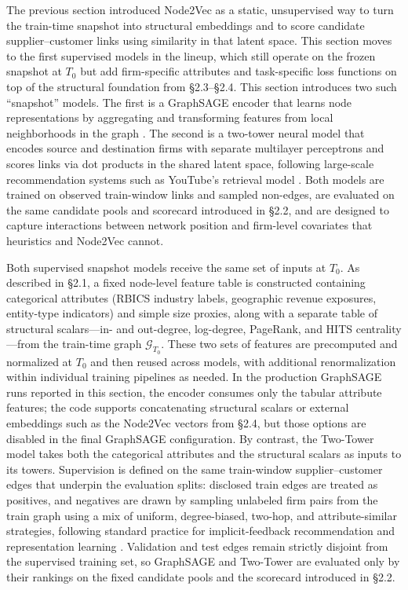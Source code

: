 The previous section introduced Node2Vec as a static, unsupervised way to turn the train-time snapshot into structural embeddings and to score candidate supplier--customer links using similarity in that latent space. This section moves to the first supervised models in the lineup, which still operate on the frozen snapshot at \(T_0\) but add firm-specific attributes and task-specific loss functions on top of the structural foundation from \S2.3--\S2.4. This section introduces two such ``snapshot'' models. The first is a GraphSAGE encoder that learns node representations by aggregating and transforming features from local neighborhoods in the graph \parencite{hamilton_representation_2017,kipf_semi-supervised_2017}. The second is a two-tower neural model that encodes source and destination firms with separate multilayer perceptrons and scores links via dot products in the shared latent space, following large-scale recommendation systems such as YouTube's retrieval model \parencite{covington_deep_2016,he_neural_2017}. Both models are trained on observed train-window links and sampled non-edges, are evaluated on the same candidate pools and scorecard introduced in \S2.2, and are designed to capture interactions between network position and firm-level covariates that heuristics and Node2Vec cannot.

Both supervised snapshot models receive the same set of inputs at \(T_0\). As described in \S2.1, a fixed node-level feature table is constructed containing categorical attributes (RBICS industry labels, geographic revenue exposures, entity-type indicators) and simple size proxies, along with a separate table of structural scalars---in- and out-degree, log-degree, PageRank, and HITS centrality---from the train-time graph \(\mathcal{G}_{T_0}\). These two sets of features are precomputed and normalized at \(T_0\) and then reused across models, with additional renormalization within individual training pipelines as needed. In the production GraphSAGE runs reported in this section, the encoder consumes only the tabular attribute features; the code supports concatenating structural scalars or external embeddings such as the Node2Vec vectors from \S2.4, but those options are disabled in the final GraphSAGE configuration. By contrast, the Two-Tower model takes both the categorical attributes and the structural scalars as inputs to its towers. Supervision is defined on the same train-window supplier--customer edges that underpin the evaluation splits: disclosed train edges are treated as positives, and negatives are drawn by sampling unlabeled firm pairs from the train graph using a mix of uniform, degree-biased, two-hop, and attribute-similar strategies, following standard practice for implicit-feedback recommendation and representation learning \parencite{mikolov_distributed_2013,rendle_bpr_2009,he_neural_2017}. Validation and test edges remain strictly disjoint from the supervised training set, so GraphSAGE and Two-Tower are evaluated only by their rankings on the fixed candidate pools and the scorecard introduced in \S2.2.

